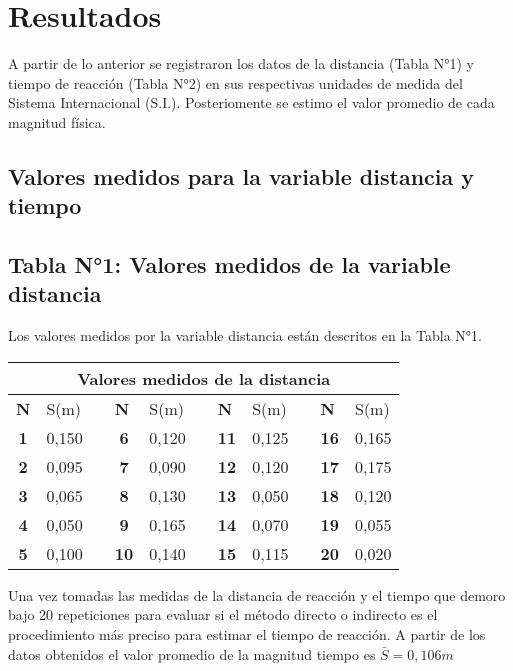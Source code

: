 \documentclass[runningheads]{llncs}
\begin{document}
    \section*{\centering Resultados}
    A partir de lo anterior se registraron los datos de la distancia (Tabla N°1) y tiempo de reacción (Tabla N°2) en sus respectivas unidades de medida del Sistema Internacional (S.I.). Posteriomente se estimo el valor promedio de cada magnitud física. \\
    \subsection*{Valores medidos para la variable distancia y tiempo} 
    \subsection*{Tabla N°1: Valores medidos de la variable distancia}
    Los valores medidos por la variable distancia están descritos en la Tabla N°1. \\
    \begin{table}[]
        \centering
        \begin{tabular}{crlcrlcrlcr}
        \hline
        \multicolumn{11}{c}{\textbf{Valores medidos de la distancia}} \\ \hline
        \multicolumn{1}{l}{\textbf{N}} & \multicolumn{1}{l}{S(m)} &  & \multicolumn{1}{l}{\textbf{N}} & \multicolumn{1}{l}{S(m)} &  & \multicolumn{1}{l}{\textbf{N}} & \multicolumn{1}{l}{S(m)} &  & \multicolumn{1}{l}{\textbf{N}} & \multicolumn{1}{l}{S(m)} \\ \hline
        \textbf{1} & 0,150 &  & \textbf{6} & 0,120 &  & \textbf{11} & 0,125 &  & \textbf{16} & 0,165 \\
        \textbf{2} & 0,095 &  & \textbf{7} & 0,090 &  & \textbf{12} & 0,120 &  & \textbf{17} & 0,175 \\
        \textbf{3} & 0,065 &  & \textbf{8} & 0,130 &  & \textbf{13} & 0,050 &  & \textbf{18} & 0,120 \\
        \textbf{4} & 0,050 &  & \textbf{9} & 0,165 &  & \textbf{14} & 0,070 &  & \textbf{19} & 0,055 \\
        \textbf{5} & 0,100 &  & \textbf{10} & 0,140 &  & \textbf{15} & 0,115 &  & \textbf{20} & 0,020 \\ \hline
        \end{tabular}
        \end{table}
    
        Una vez tomadas las medidas de la distancia de reacción y el tiempo que demoro bajo 20 repeticiones para evaluar si el método directo o indirecto es el procedimiento más preciso para estimar el tiempo de reacción. 
        A partir de los datos obtenidos el valor promedio de la magnitud tiempo es $\bar{S}=0,106m$
\end{document}
